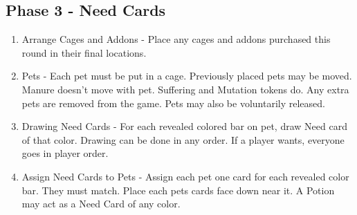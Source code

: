\documentclass[12pt]{article}
\newenvironment{enumerateCustom}
{\begin{enumerate}
  \setlength{\itemsep}{1pt}
  \setlength{\parskip}{0pt}
  \setlength{\parsep}{0pt}}
{\end{enumerate}}
\begin{document}
\begin{multicols*}{2}
\subsection*{Phase 3 - Need Cards}

\begin{enumerateCustom}
	\item Arrange Cages and Addons - Place any cages and addons purchased this round in their final locations.
	\item Pets - Each pet must be put in a cage. Previously placed pets may be moved. Manure doesn't move with pet. Suffering and Mutation tokens do. Any extra pets are removed from the game. Pets may also be voluntarily released.
	\item Drawing Need Cards - For each revealed colored bar on pet, draw Need card of that color. Drawing can be done in any order. If a player wants, everyone goes in player order.
	\item Assign Need Cards to Pets - Assign each pet one card for each revealed color bar. They must match. Place each pets cards face down near it. A Potion may act as a Need Card of any color.
\end{enumerateCustom}


\end{multicols*}
\end{document}

